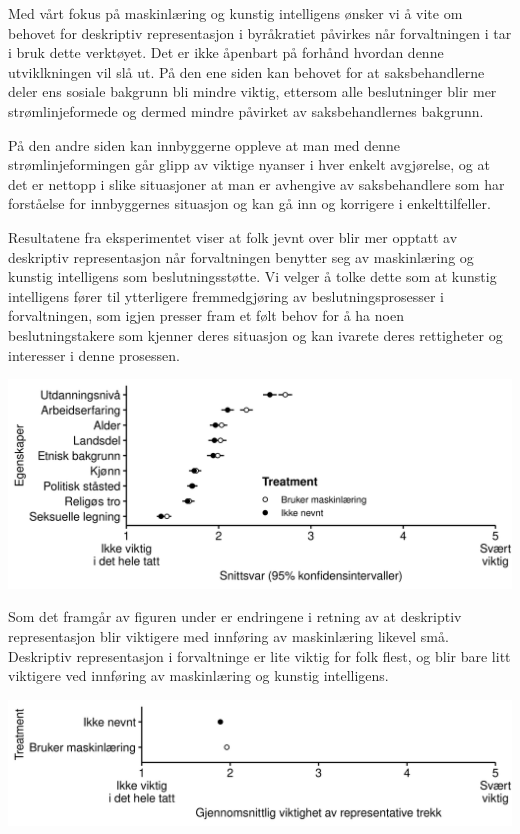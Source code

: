 \documentclass[
]{book}
\begin{document}
Med vårt fokus på maskinlæring og kunstig intelligens ønsker vi å vite om behovet for deskriptiv representasjon i byråkratiet påvirkes når forvaltningen i tar i bruk dette verktøyet.
Det er ikke åpenbart på forhånd hvordan denne utviklkningen vil slå ut.
På den ene siden kan behovet for at saksbehandlerne deler ens sosiale bakgrunn bli mindre viktig, ettersom alle beslutninger blir mer strømlinjeformede og dermed mindre påvirket av saksbehandlernes bakgrunn.

På den andre siden kan innbyggerne oppleve at man med denne strømlinjeformingen går glipp av viktige nyanser i hver enkelt avgjørelse, og at det er nettopp i slike situasjoner at man er avhengive av saksbehandlere som har forståelse for innbyggernes situasjon og kan gå inn og korrigere i enkelttilfeller.

Resultatene fra eksperimentet viser at folk jevnt over blir mer opptatt av deskriptiv representasjon når forvaltningen benytter seg av maskinlæring og kunstig intelligens som beslutningsstøtte.
Vi velger å tolke dette som at kunstig intelligens fører til ytterligere fremmedgjøring av beslutningsprosesser i forvaltningen, som igjen presser fram et følt behov for å ha noen beslutningstakere som kjenner deres situasjon og kan ivarete deres rettigheter og interesser i denne prosessen.

\includegraphics{figs/png/fig_exp_repr_each.png}

Som det framgår av figuren under er endringene i retning av at deskriptiv representasjon blir viktigere med innføring av maskinlæring likevel små.
Deskriptiv representasjon i forvaltninge er lite viktig for folk flest, og blir bare litt viktigere ved innføring av maskinlæring og kunstig intelligens.

\includegraphics{figs/png/fig_exp_repr_avg.png}

  
\end{document}
